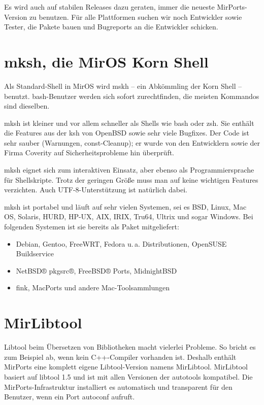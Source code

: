 \documentclass[a4paper,landscape,11pt,notumble]{leaflet}
\begin{document}
Es wird auch auf stabilen Releases dazu geraten, immer die neueste MirPorts-Version zu benutzen. Für alle Plattformen suchen wir noch Entwickler sowie Tester, die Pakete bauen und Bugreports an die Entwickler schicken.

\newpage

\section{mksh, die MirOS Korn Shell}

Als Standard-Shell in MirOS wird mskh -- ein Abkömmling der Korn Shell -- benutzt. bash-Benutzer werden sich sofort zurechtfinden, die meisten Kommandos sind dieselben.

mksh ist kleiner und vor allem schneller als Shells wie bash oder zsh. Sie enthält die Features aus der ksh von OpenBSD sowie sehr viele Bugfixes. Der Code ist sehr sauber (Warnungen, const-Cleanup); er wurde von den Entwicklern sowie der Firma Coverity auf Sicherheitsprobleme hin überprüft.

mksh eignet sich zum interaktiven Einsatz, aber ebenso als Programmiersprache für Shellskripte. Trotz der geringen Größe muss man auf keine wichtigen Features verzichten. Auch UTF-8-Unterstützung ist natürlich dabei.

mksh ist portabel und läuft auf sehr vielen Systemen, sei es BSD, Linux, Mac OS, Solaris, HURD, HP-UX, AIX, IRIX, Tru64, Ultrix und sogar Windows. Bei folgenden Systemen ist sie bereits als Paket mitgeliefert:

\begin{itemize}
\item Debian, Gentoo, FreeWRT, Fedora u.\,a. Distributionen, OpenSUSE Buildservice
\item NetBSD® pkgsrc®, FreeBSD® Ports, MidnightBSD
\item fink, MacPorts und andere Mac-Toolsammlungen
\end{itemize}

\section{MirLibtool}

Libtool beim Übersetzen von Bibliotheken macht vielerlei Probleme. So bricht es zum Beispiel ab, wenn kein C++-Compiler vorhanden ist. Deshalb enthält MirPorts eine komplett eigene Libtool-Version namens MirLibtool.
MirLibtool basiert auf libtool 1.5 und ist mit allen Versionen der autotools kompatibel. Die MirPorts-Infrastruktur installiert es automatisch und transparent für den Benutzer, wenn ein Port autoconf aufruft.
\end{document}
